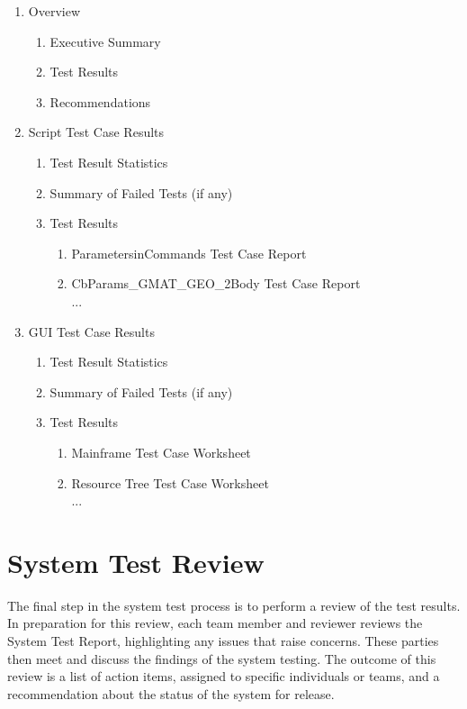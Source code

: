 \renewcommand\theenumi   {\Roman{enumi}}
\renewcommand\theenumii  {\Alph{enumii}}
\renewcommand\labelenumii{\theenumii.}
\begin{enumerate}
\item Overview
\begin{enumerate}
\item Executive Summary
\item Test Results
\item Recommendations
\end{enumerate}
\item Script Test Case Results
\begin{enumerate}
\item Test Result Statistics
\item Summary of Failed Tests (if any)
\item Test Results
\begin{enumerate}
\item ParametersinCommands Test Case Report
\item CbParams\_GMAT\_GEO\_2Body Test Case Report\\
...
\end{enumerate}
\end{enumerate}
\item GUI Test Case Results
\begin{enumerate}
\item Test Result Statistics
\item Summary of Failed Tests (if any)
\item Test Results
\begin{enumerate}
\item Mainframe Test Case Worksheet
\item Resource Tree Test Case Worksheet\\
...
\end{enumerate}
\end{enumerate}
\end{enumerate}

\section{\label{section:TestReview}System Test Review}

The final step in the system test process is to perform a review of the test results.  In preparation for this review, each team member and reviewer reviews the System Test Report, highlighting any issues that raise concerns.  These parties then meet and discuss the findings of the system testing.  The outcome of this review is a list of action items, assigned to specific individuals or teams, and a recommendation about the status of the system for release.  

